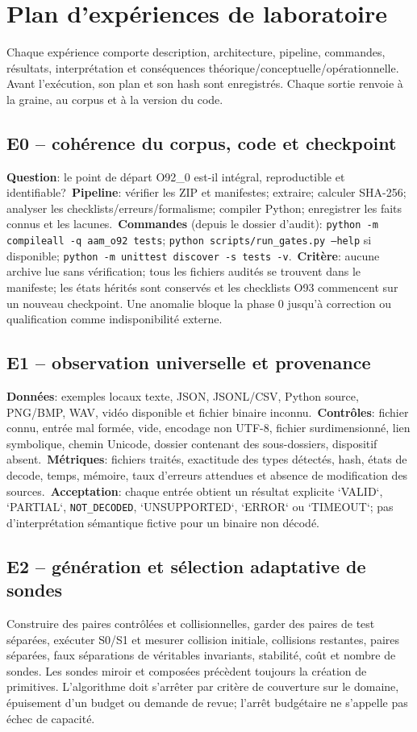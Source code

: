 \documentclass[11pt,a4paper,oneside]{report}
\begin{document}
\chapter{Plan d'expériences de laboratoire}
Chaque expérience comporte description, architecture, pipeline, commandes, résultats, interprétation et conséquences théorique/conceptuelle/opérationnelle. Avant l'exécution, son plan et son hash sont enregistrés. Chaque sortie renvoie à la graine, au corpus et à la version du code.

\section{E0 -- cohérence du corpus, code et checkpoint}
\textbf{Question}: le point de départ O92\_0 est-il intégral, reproductible et identifiable?\
\textbf{Pipeline}: vérifier les ZIP et manifestes; extraire; calculer SHA-256; analyser les checklists/erreurs/formalisme; compiler Python; enregistrer les faits connus et les lacunes.\
\textbf{Commandes} (depuis le dossier d'audit): \texttt{python -m compileall -q aam\_o92 tests}; \texttt{python scripts/run\_gates.py --help} si disponible; \texttt{python -m unittest discover -s tests -v}.\
\textbf{Critère}: aucune archive lue sans vérification; tous les fichiers audités se trouvent dans le manifeste; les états hérités sont conservés et les checklists O93 commencent sur un nouveau checkpoint. Une anomalie bloque la phase 0 jusqu'à correction ou qualification comme indisponibilité externe.

\section{E1 -- observation universelle et provenance}
\textbf{Données}: exemples locaux texte, JSON, JSONL/CSV, Python source, PNG/BMP, WAV, vidéo disponible et fichier binaire inconnu.\
\textbf{Contrôles}: fichier connu, entrée mal formée, vide, encodage non UTF-8, fichier surdimensionné, lien symbolique, chemin Unicode, dossier contenant des sous-dossiers, dispositif absent.\
\textbf{Métriques}: fichiers traités, exactitude des types détectés, hash, états de decode, temps, mémoire, taux d'erreurs attendues et absence de modification des sources.\
\textbf{Acceptation}: chaque entrée obtient un résultat explicite `VALID`, `PARTIAL`, \texttt{NOT\_DECODED}, `UNSUPPORTED`, `ERROR` ou `TIMEOUT`; pas d'interprétation sémantique fictive pour un binaire non décodé.

\section{E2 -- génération et sélection adaptative de sondes}
Construire des paires contrôlées et collisionnelles, garder des paires de test séparées, exécuter S0/S1 et mesurer collision initiale, collisions restantes, paires séparées, faux séparations de véritables invariants, stabilité, coût et nombre de sondes. Les sondes miroir et composées précèdent toujours la création de primitives. L'algorithme doit s'arrêter par critère de couverture sur le domaine, épuisement d'un budget ou demande de revue; l'arrêt budgétaire ne s'appelle pas échec de capacité.
\end{document}
